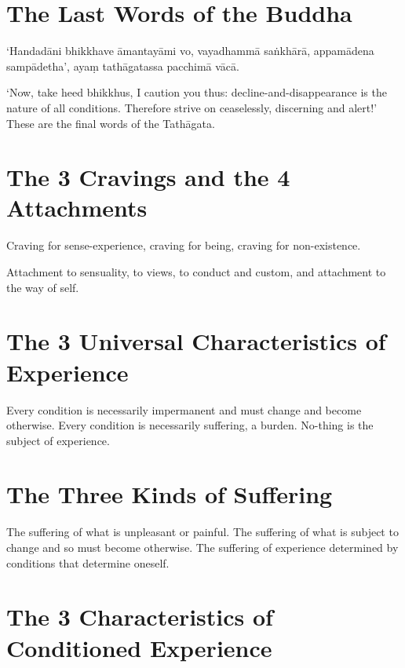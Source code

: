 \section*{The Last Words of the Buddha}

‘Handadāni bhikkhave āmantayāmi vo, vayadhammā saṅkhārā, appamādena sampādetha’,
ayaṃ tathāgatassa pacchimā vācā.

‘Now, take heed bhikkhus, I caution you thus: decline-and-disappearance is the
nature of all conditions. Therefore strive on ceaselessly, discerning and
alert!’ These are the final words of the Tathāgata.


\section*{The 3 Cravings and the 4 Attachments}

Craving for sense-experience, craving for being, craving for non-existence.

Attachment to sensuality, to views, to conduct and custom, and attachment to the
way of self.


\vspace*{-\baselineskip}

\section*{The 3 Universal Characteristics of Experience}

Every condition is necessarily impermanent and must change and become otherwise.
Every condition is necessarily suffering, a burden.
No-thing is the subject of experience.


\vspace*{-\baselineskip}

\section*{The Three Kinds of Suffering}

The suffering of what is unpleasant or painful. The suffering of what is subject
to change and so must become otherwise. The suffering of experience determined
by conditions that determine oneself.\\
\mbox{}

\section*{The 3 Characteristics of Conditioned Experience}

